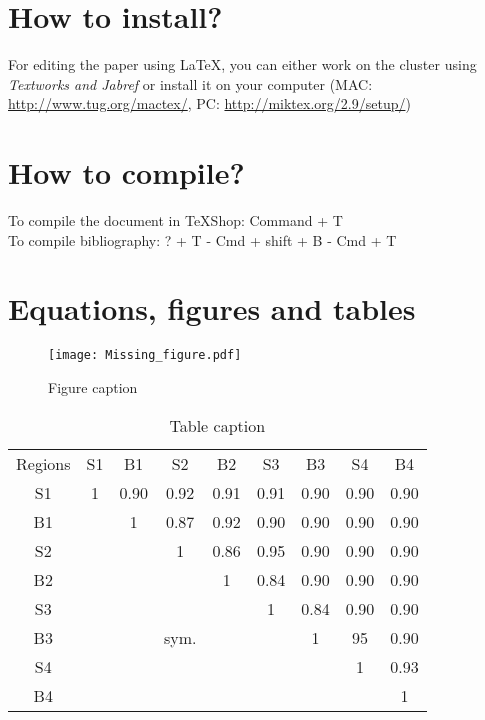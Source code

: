 \documentclass[11pt,twoside]{article}
\begin{document}
\maketitle

\begin{abstract}
\noindent {}
\end{abstract}

\section{How to install?}\label{S:Introduction}
For editing the paper using \LaTeX, you can either work on the cluster using \emph{Textworks and Jabref} or install it on your computer (MAC: \url{http://www.tug.org/mactex/}, PC: \url{http://miktex.org/2.9/setup/})

\section{How to compile?}

\noindent To compile the document in TeXShop: Command + T\\

\noindent To compile bibliography: ? + T - Cmd + shift + B - Cmd + T 


\section{Equations, figures and tables }\label{S:SNAME}

\begin{figure}\centering
\texttt{[image: Missing\_figure.pdf]}
\caption{Figure caption}
\label{FIG:fig_name}
\end{figure}

\begin{table}[h]
\caption{Table caption} 
\centering
\begin{tabular}{ccccccccc}
\toprule
Regions & S1& B1 & S2 &B2 & S3 & B3 & S4 & B4 \\
\cmidrule(lr){1-9}
  S1 & 1& 0.90&  0.92& 0.91  & 0.91&0.90& 0.90&0.90\\
  B1 &  &1 & 0.87&  0.92   &0.90& 0.90&0.90&0.90  \\
  S2  &  & &1 &0.86&0.95&0.90&0.90 &0.90 \\
  B2 &   & &  &1&  0.84 & 0.90 & 0.90 &  0.90    \\
  S3  &  & & & &1&0.84&  0.90  &0.90\\
  B3  &  & &sym. &  & &1& 95    &0.90\\
  S4  & & & & & & & 1& 0.93\\
  B4  & & & & & & & & 1\\
\bottomrule
\end{tabular}
\label{table:tablename}
\end{table}
\end{document}
